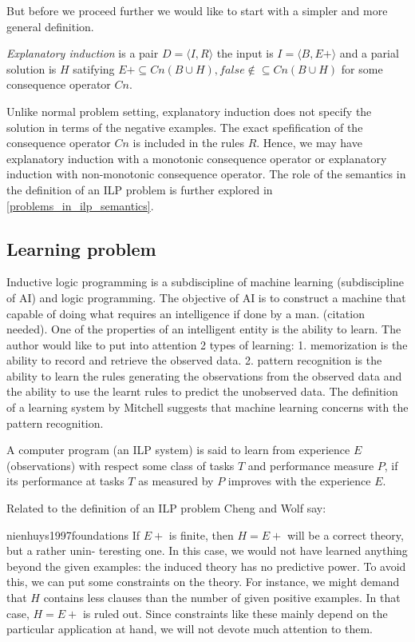 But before we proceed further we would like to start with a simpler and more general definition.
\begin{defn}
\emph{Explanatory induction}\cite{yamamoto2012inverse} is a pair $D=\langle I, R \rangle$
the input is $I=\langle B, E+ \rangle$ and a parial solution is $H$ satifying
$E+ \subseteq Cn(B \cup H), false \not\in \subseteq Cn(B \cup H)$ for some consequence operator $Cn$.
\end{defn}
Unlike normal problem setting, explanatory induction does not specify the solution in terms of the negative examples. The exact spefification of the consequence operator $Cn$ is included in the rules $R$. Hence, we may have explanatory induction with a monotonic consequence operator or explanatory induction with non-monotonic consequence operator. The role of the semantics in the definition of an ILP problem is further explored in \ref{problems_in_ilp_semantics}.

\subsection{Learning problem}
Inductive logic programming is a subdiscipline of machine learning (subdiscipline of AI) and logic programming. The objective of AI is to construct a machine that capable of doing what requires an intelligence if done by a man. (citation needed). One of the properties of an intelligent entity is the ability to learn. The author would like to put into attention 2 types of learning:
1. memorization is the ability to record and retrieve the observed data.
2. pattern recognition is the ability to learn the rules generating the observations from the observed data and the ability to use the learnt rules to predict the unobserved data. The definition of a learning system by Mitchell suggests that machine learning concerns with the pattern recognition.

\begin{defn}\cite{mitchell1997machine}
A computer program (an ILP system) is said to learn from experience $E$ (observations)
with respect some class of tasks $T$ and performance measure $P$,
if its performance at tasks $T$ as measured by $P$ improves with the experience $E$.
\end{defn}

Related to the definition of an ILP problem Cheng and Wolf say:

\begin{cite}{nienhuys1997foundations}
If $E+$ is finite, then $H = E+$ will be a correct theory, but a rather unin-
teresting one. In this case, we would not have learned anything beyond the
given examples: the induced theory has no predictive power. To avoid this,
we can put some constraints on the theory. For instance, we might demand
that $H$ contains less clauses than the number of given positive examples. In
that case, $H = E+$ is ruled out. Since constraints like these mainly depend
on the particular application at hand, we will not devote much attention to
them.
\end{cite}

